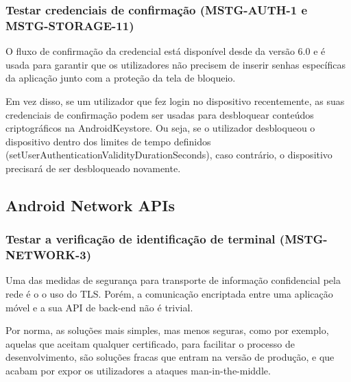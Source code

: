 \subsubsection{Testar credenciais de confirmação (MSTG-AUTH-1 e MSTG-STORAGE-11)}\par
\hfill\par
\hfill\par
\par O fluxo de confirmação da credencial está disponível desde da versão 6.0 e é usada para garantir que os utilizadores não precisem de inserir senhas específicas da aplicação junto com a proteção da tela de bloqueio. 

\par Em vez disso, se um utilizador que fez login no dispositivo recentemente, as suas credenciais de confirmação podem ser usadas para desbloquear conteúdos criptográficos na AndroidKeystore. Ou seja, se o utilizador desbloqueou o dispositivo dentro dos limites de tempo definidos (setUserAuthenticationValidityDurationSeconds), caso contrário, o dispositivo precisará de ser desbloqueado novamente.





\subsection{Android Network APIs}

\subsubsection{Testar a verificação de identificação de terminal (MSTG-NETWORK-3)}\par
\hfill\par
\hfill\par
\par Uma das medidas de segurança para transporte de informação confidencial pela rede é o o uso do TLS. Porém, a comunicação encriptada entre uma aplicação móvel e a sua API de back-end não é trivial. 

\par Por norma, as soluções mais simples, mas menos seguras, como por exemplo, aquelas que aceitam qualquer certificado, para facilitar o processo de desenvolvimento, são soluções fracas que entram na versão de produção, e que acabam por expor os utilizadores a ataques man-in-the-middle.

